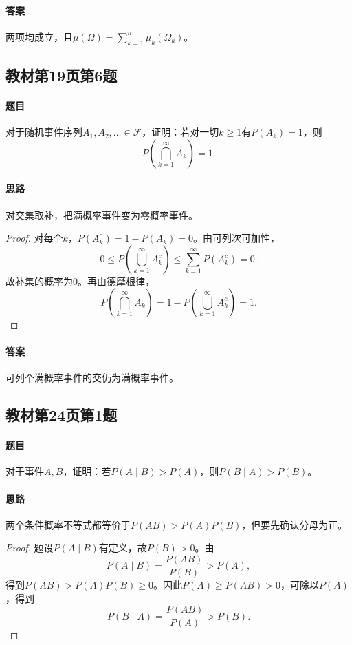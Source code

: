 \paragraph{答案}两项均成立，且$\mu(\Omega)=\sum_{k=1}^n\mu_k(\Omega_k)$。

\subsection{教材第19页第6题}\label{ex:w03-t6}
\paragraph{题目}
对于随机事件序列$A_1,A_2,\ldots\in\mathscr F$，证明：若对一切$k\geq1$有$P(A_k)=1$，则
\[P\left(\bigcap_{k=1}^{\infty}A_k\right)=1.\]
\paragraph{思路}对交集取补，把满概率事件变为零概率事件。
\begin{proof}
对每个$k$，$P(A_k^c)=1-P(A_k)=0$。由可列次可加性，
\[0\leq P\left(\bigcup_{k=1}^{\infty}A_k^c\right)
\leq\sum_{k=1}^{\infty}P(A_k^c)=0.\]
故补集的概率为0。再由德摩根律，
\[P\left(\bigcap_{k=1}^{\infty}A_k\right)
=1-P\left(\bigcup_{k=1}^{\infty}A_k^c\right)=1.\]
\end{proof}
\paragraph{答案}可列个满概率事件的交仍为满概率事件。

\subsection{教材第24页第1题}\label{ex:w03-t241}
\paragraph{题目}
对于事件$A,B$，证明：若$P(A\mid B)>P(A)$，则$P(B\mid A)>P(B)$。
\paragraph{思路}两个条件概率不等式都等价于$P(AB)>P(A)P(B)$，但要先确认分母为正。
\begin{proof}
题设$P(A\mid B)$有定义，故$P(B)>0$。由
\[P(A\mid B)=\frac{P(AB)}{P(B)}>P(A),\]
得到$P(AB)>P(A)P(B)\geq0$。因此$P(A)\geq P(AB)>0$，可除以$P(A)$，得到
\[P(B\mid A)=\frac{P(AB)}{P(A)}>P(B).\]
\end{proof}
